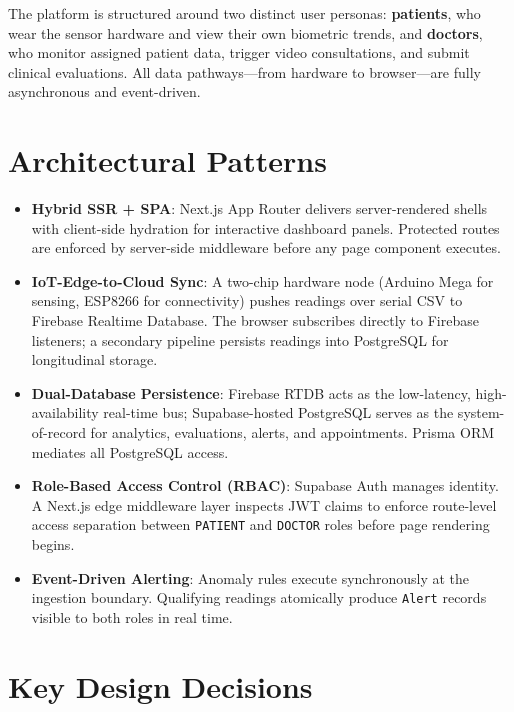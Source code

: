 \documentclass[12pt,a4paper]{report}
\begin{document}
The platform is structured around two distinct user personas: \textbf{patients},
who wear the sensor hardware and view their own biometric trends, and
\textbf{doctors}, who monitor assigned patient data, trigger video consultations,
and submit clinical evaluations. All data pathways---from hardware to browser---are
fully asynchronous and event-driven.

\section{Architectural Patterns}

\begin{itemize}[leftmargin=1.5em]
  \item \textbf{Hybrid SSR + SPA}: Next.js App Router delivers server-rendered
        shells with client-side hydration for interactive dashboard panels.
        Protected routes are enforced by server-side middleware before any
        page component executes.

  \item \textbf{IoT-Edge-to-Cloud Sync}: A two-chip hardware node
        (Arduino Mega for sensing, ESP8266 for connectivity) pushes readings
        over serial CSV to Firebase Realtime Database. The browser subscribes
        directly to Firebase listeners; a secondary pipeline persists readings
        into PostgreSQL for longitudinal storage.

  \item \textbf{Dual-Database Persistence}: Firebase RTDB acts as the
        low-latency, high-availability real-time bus; Supabase-hosted PostgreSQL
        serves as the system-of-record for analytics, evaluations, alerts, and
        appointments. Prisma ORM mediates all PostgreSQL access.

  \item \textbf{Role-Based Access Control (RBAC)}: Supabase Auth manages
        identity. A Next.js edge middleware layer inspects JWT claims to enforce
        route-level access separation between \texttt{PATIENT} and
        \texttt{DOCTOR} roles before page rendering begins.

  \item \textbf{Event-Driven Alerting}: Anomaly rules execute synchronously
        at the ingestion boundary. Qualifying readings atomically produce
        \texttt{Alert} records visible to both roles in real time.
\end{itemize}

\section{Key Design Decisions}
\end{document}
